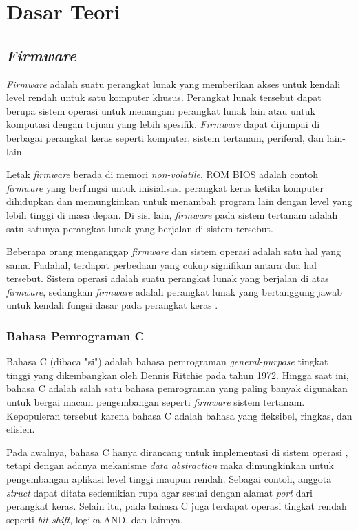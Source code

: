 \section{Dasar Teori}
\subsection{\textit{Firmware}}
\textit{Firmware} adalah suatu perangkat lunak yang memberikan akses untuk kendali level rendah untuk satu komputer khusus. Perangkat lunak tersebut dapat berupa sistem operasi untuk menangani perangkat lunak lain atau untuk komputasi dengan tujuan yang lebih spesifik. \textit{Firmware} dapat dijumpai di berbagai perangkat keras seperti komputer, sistem tertanam, periferal, dan lain-lain.

Letak \textit{firmware} berada di memori \textit{non-volatile}. ROM BIOS adalah contoh \textit{firmware} yang berfungsi untuk inisialisasi perangkat keras ketika komputer dihidupkan dan memungkinkan untuk menambah program lain dengan level yang lebih tinggi di masa depan. Di sisi lain, \textit{firmware} pada sistem tertanam adalah satu-satunya perangkat lunak yang berjalan di sistem tersebut.

Beberapa orang menganggap \textit{firmware} dan sistem operasi adalah satu hal yang sama. Padahal, terdapat perbedaan yang cukup signifikan antara dua hal tersebut. Sistem operasi adalah suatu perangkat lunak yang berjalan di atas \textit{firmware}, sedangkan \textit{firmware} adalah perangkat lunak yang bertanggung jawab untuk kendali fungsi dasar pada perangkat keras \cite{Davidson1978}.

\subsubsection{Bahasa Pemrograman C}
Bahasa C (dibaca "si") adalah bahasa pemrograman \textit{general-purpose} tingkat tinggi yang dikembangkan oleh Dennis Ritchie pada tahun 1972. Hingga saat ini, bahasa C adalah salah satu bahasa pemrograman yang paling banyak digunakan \cite{SO2022} untuk bergai macam pengembangan seperti \textit{firmware} sistem tertanam. Kepopuleran tersebut karena bahasa C adalah bahasa yang fleksibel, ringkas, dan efisien.

Pada awalnya, bahasa C hanya dirancang untuk implementasi di sistem operasi \cite{Ritchie1993}, tetapi dengan adanya mekanisme \textit{data abstraction} maka dimungkinkan untuk pengembangan aplikasi level tinggi maupun rendah. Sebagai contoh, anggota \textit{struct} dapat ditata sedemikian rupa agar sesuai dengan alamat \textit{port} dari perangkat keras. Selain itu, pada bahasa C juga terdapat operasi tingkat rendah seperti \textit{bit shift}, logika AND, dan lainnya.

